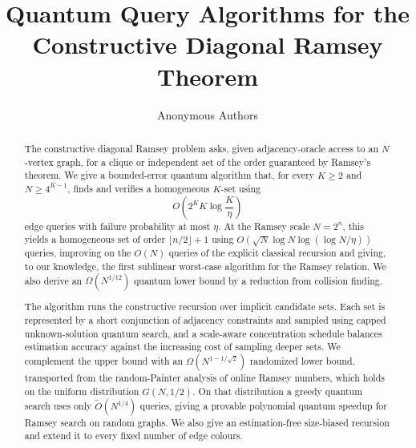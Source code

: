 \documentclass[a4paper,UKenglish,cleveref,numberwithinsect,anonymous]{lipics-v2021}
\title{Quantum Query Algorithms for the Constructive Diagonal Ramsey Theorem}
\author{Anonymous Authors}{Anonymous affiliation}{}{}{}
\begin{document}
\maketitle

\begin{abstract}
The constructive diagonal Ramsey problem asks, given adjacency-oracle access
to an $N$-vertex graph, for a clique or independent set of the order
guaranteed by Ramsey's theorem.  We give a bounded-error quantum algorithm
that, for every $K\ge2$ and $N\ge4^{K-1}$, finds and verifies a homogeneous
$K$-set using
\[
  O\!\left(2^K K\log\frac K\eta\right)
\]
edge queries with failure probability at most $\eta$.  At the Ramsey scale
$N=2^n$, this yields a homogeneous set of order $\lfloor n/2\rfloor+1$
using $O(\sqrt N\log N\log(\log N/\eta))$ queries, improving on the $O(N)$
queries of the explicit classical recursion and giving, to our knowledge,
the first sublinear worst-case algorithm for the Ramsey relation.
We also derive an $\Omega(N^{1/12})$ quantum lower bound by a reduction
from collision finding.

The algorithm runs the constructive recursion over implicit candidate sets.
Each set is represented by a short conjunction of adjacency constraints and
sampled using capped unknown-solution quantum search, and a scale-aware
concentration schedule balances estimation accuracy against the increasing
cost of sampling deeper sets.  We complement the upper bound with an
$\Omega(N^{1-1/\sqrt2})$ randomized lower bound, transported from the
random-Painter analysis of online Ramsey numbers, which holds on the uniform
distribution $G(N,1/2)$.  On that distribution a greedy quantum search uses
only $\widetilde O(N^{1/4})$ queries, giving a provable polynomial quantum
speedup for Ramsey search on random graphs.  We also give an
estimation-free size-biased recursion and extend it to every fixed number
of edge colours.
\end{abstract}








\clearpage



\clearpage
\appendix




\end{document}

